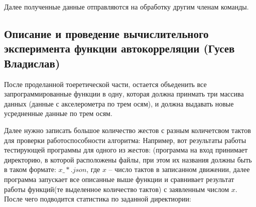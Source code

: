 Далее полученные данные отправляются на обработку другим членам команды.

\subsection{Описание и проведение вычислительного эксперимента функции автокорреляции (Гусев Владислав)}
После проделанной тоеретической части, остается объеденить все запрограммированные функции в одну, которая должна принмать три массива данных (данные с акселерометра по трем осям), и должна выдавать новые усредненные данные по трем осям.

Далее нужно записать большое количество жестов с разным количетсвом тактов для проверки работоспособности алгоритма:
Например, вот результаты работы тестирующей программы для одного из жестов:
(программа на вход принимает директорию, в которой расположены файлы, при этом их названия должны быть в таком формате: $x\_*.json$, где $x$ -- число тактов в записанном движении, далее программа запускает все описанные выше функции и сравнивает результат работы функций(те выделенное количество тактов) с заявленным числом $x$. После чего подводится статистика по заданной директиории:

\begin{figure}[H]
\end{figure}

